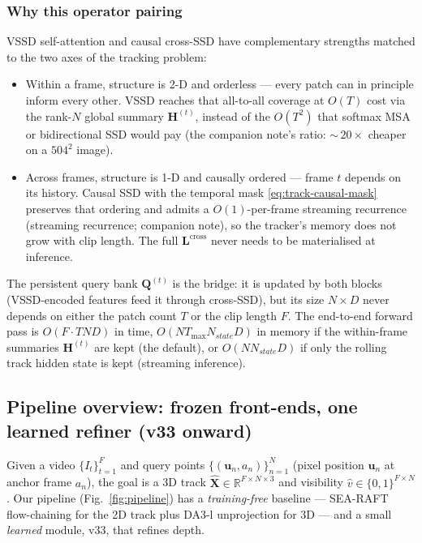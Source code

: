 \documentclass[11pt,a4paper]{article}
\begin{document}
\subsubsection{Why this operator pairing}
\label{sec:track-why}

VSSD self-attention and causal cross-SSD have complementary
strengths matched to the two axes of the tracking problem:
\begin{itemize}
  \item Within a frame, structure is 2-D and orderless — every patch
        can in principle inform every other. VSSD reaches that
        all-to-all coverage at $O(T)$ cost via the rank-$N$ global
        summary $\bm{H}^{(t)}$, instead of the $O(T^{2})$ that
        softmax MSA or bidirectional SSD would pay
        (the companion note's ratio: $\sim$\,$20\!\times$
        cheaper on a $504^{2}$ image).
  \item Across frames, structure is 1-D and causally ordered — frame
        $t$ depends on its history. Causal SSD with the temporal
        mask \eqref{eq:track-causal-mask} preserves that ordering
        and admits a $O(1)$-per-frame streaming recurrence
        (streaming recurrence; companion note), so the tracker's memory does not
        grow with clip length. The full $\bm{L}^{\text{cross}}$
        never needs to be materialised at inference.
\end{itemize}
The persistent query bank $\bm{Q}^{(t)}$ is the bridge: it is
updated by both blocks (VSSD-encoded features feed it through
cross-SSD), but its size $N\!\times\!D$ never depends on either the
patch count $T$ or the clip length $F$. The end-to-end forward pass
is $O(F \cdot T N D)$ in time, $O(N T_{\max} N_{\!state} D)$ in
memory if the within-frame summaries $\bm{H}^{(t)}$ are kept (the
default), or $O(N N_{\!state} D)$ if only the rolling track hidden
state is kept (streaming inference).

\subsection{Pipeline overview: frozen front-ends, one learned refiner (v33 onward)}
Given a video $\{I_t\}_{t=1}^{F}$ and query points $\{(\mathbf{u}_n, a_n)\}_{n=1}^{N}$ (pixel
position $\mathbf{u}_n$ at anchor frame $a_n$), the goal is a 3D track
$\hat{\mathbf X}\in\mathbb{R}^{F\times N\times 3}$ and visibility $\hat v\in\{0,1\}^{F\times N}$.
Our pipeline (Fig.~\ref{fig:pipeline}) has a \emph{training-free} baseline --- SEA-RAFT
flow-chaining for the 2D track plus DA3-l unprojection for 3D --- and a small \emph{learned} module,
v33, that refines depth.
\end{document}

